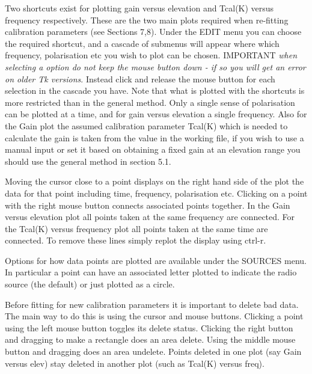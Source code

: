 \vskip 0.3cm
 Two shortcuts exist for plotting gain versus
elevation and Tcal(K) versus frequency respectively. These are the two main 
plots required when re-fitting calibration parameters (see Sections 7,8). Under the EDIT menu 
you can choose the required shortcut, and a cascade of submenus will appear where 
which frequency, polarisation etc you wish to plot can be chosen. IMPORTANT 
{\it when selecting a option do not keep the mouse button down - if so you will get an error on older Tk versions}. Instead click and release the mouse button for each 
selection in the cascade you have. Note that what is plotted with the 
shortcuts is more restricted than in 
the general method. Only a single sense of polarisation can be plotted 
at a time, and for gain versus elevation a single frequency. Also for the 
Gain plot the assumed calibration  parameter Tcal(K) which is needed to calculate 
the gain is taken from the  value in the working file, if you wish to use a
manual input or set it based on obtaining a fixed gain at an elevation range
you  should use the general method  in section 5.1.

\vskip 1cm


\vskip 0.5cm

Moving the cursor close to a point displays on the right hand side of the plot the 
data for that point including time, frequency, polarisation etc. Clicking on a 
point with the right mouse button connects associated points together. In the 
Gain versus elevation plot  all 
points taken at the same frequency are connected. For the 
Tcal(K) versus frequency plot all points
taken at the same time are connected. To remove these lines simply
replot the display using ctrl-r.

Options for how data points are plotted are available under the 
SOURCES menu. In particular a point can have an associated letter 
plotted  to indicate the radio source (the default) or just 
plotted as a circle.

Before fitting for new calibration parameters it is important to 
delete bad data. The main way to do this is using the cursor and mouse 
buttons. Clicking a point using the left mouse button toggles its delete status. 
Clicking the right button and dragging to make a rectangle does 
an area delete. Using the middle mouse button and dragging does 
an area undelete. Points deleted in one plot (say Gain versus elev) 
stay deleted in another  plot (such as Tcal(K) versus freq).

